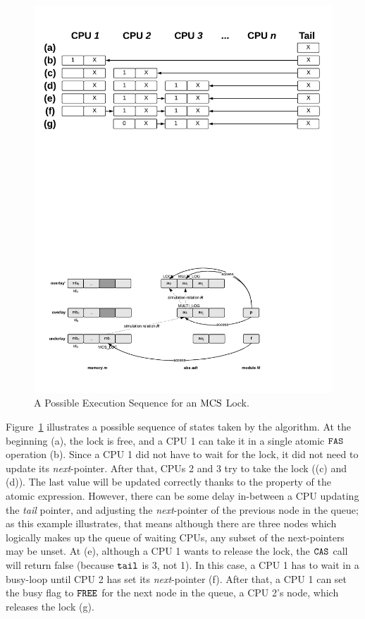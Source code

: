 \begin{figure}
\begin{center}
\includegraphics[width=0.9\linewidth]{figs/mcslock/mcsex}
\end{center}
\caption{A Possible Execution Sequence for an $\mathrm{MCS}$ Lock.}
\label{fig:chapter:mcslock:mcs-example}
\end{figure}

Figure~\ref{fig:chapter:mcslock:mcs-example} illustrates a possible sequence of states taken by the algorithm. 
At the beginning (a), the lock is free, and a CPU 1 can take it in a single atomic ${\mathrm{\texttt{FAS}}}$ operation (b).
Since a CPU 1 did not have to wait for the lock, it did not need to update its \emph{next}-pointer. 
After that, CPUs 2 and 3  try to take the lock ((c) and (d)). 
The last value will be updated correctly thanks to the property of the atomic expression.
However, there can be some delay in-between a CPU updating the \emph{tail} pointer, and adjusting the \emph{next}-pointer of the previous node in the queue; as this example illustrates, that means although there are three nodes which logically makes up the queue of waiting CPUs, any subset of the next-pointers may be unset. 
At (e), although a CPU 1 wants to release the lock, the ${\mathrm{\texttt{CAS}}}$
call will return false (because ${\mathrm{\texttt{tail}}}$ is 3, not 1).
In this case, a CPU 1 has to wait in a busy-loop until CPU 2 has set its \emph{next}-pointer (f).
After that, a CPU 1 can set the busy flag to ${\mathrm{\texttt{FREE}}}$ for the next node in the queue, a CPU 2's node, which releases the lock (g).

